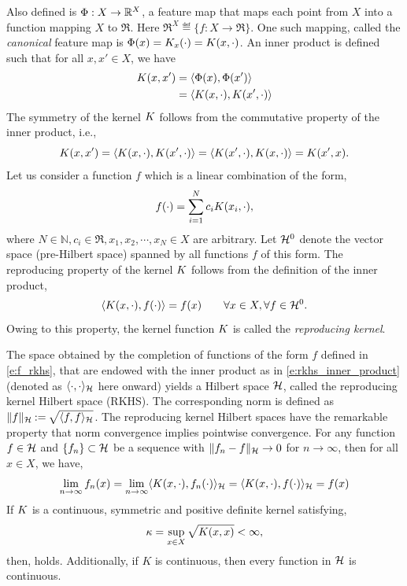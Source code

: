 Also defined is $\Phi: X \to \mathbb{R}^X$, a feature map that maps each point from $X$ into a function mapping $X$ to $\Re$. Here $\Re^X \eqdef \{f: X \to \Re \}$. One such mapping, called the \textit{canonical} feature map is $\Phi(x) = K_x(\cdot) =  K(x,\cdot)$. An inner product is defined such that for all $x,x' \in X$, we have
\begin{equation}
\begin{aligned}
\Kern(x,x') &= \langle \featuremap(x), \featuremap(x')\rangle \\
& = \langle \Kern(x,\cdot), \Kern(x',\cdot)\rangle
\end{aligned}
\label{e:rkhs_inner_product}
\end{equation}
The symmetry of the kernel $K$ follows from the commutative property of the inner product, i.e.,
\[
K(x,x') = \langle K(x, \cdot), K(x',\cdot) \rangle = \langle K(x',\cdot), K(x,\cdot) \rangle = K(x', x). 
\]
Let us consider a function $f$ which is a linear combination of the form,
\begin{equation}
f(\cdot) = \sum_{i=1}^N c_i \Kern(x_i, \cdot),
\label{e:f_rkhs}
\end{equation}
where $N \in \mathbb{N}, c_i \in \Re, x_1,x_2,\cdots, x_N \in X$ are arbitrary. Let ${\cal H}^0$ denote the vector space (pre-Hilbert space) spanned by all functions $f$ of this form. 
The reproducing property of the kernel $K$ follows from the definition of the inner product,
\[
\langle K(x,\cdot), f(\cdot)\rangle = f(x) \qquad \forall x \in X, \forall f \in {\cal H}^0.
\]
Owing to this property, the kernel function $K$ is called the \textit{reproducing kernel}. 

The space obtained by the completion of functions of the form $f$ defined in \eqref{e:f_rkhs}, that are endowed with the inner product as in \eqref{e:rkhs_inner_product} (denoted as $\langle \cdot, \cdot \rangle_{{\cal H}}$ here onward) yields a Hilbert space ${\cal H}$, called the reproducing kernel Hilbert space (RKHS). The corresponding norm is defined as $\|f\|_{\cal H} \mathbin{:=} \sqrt{\langle f, f \rangle_{\cal H}}$. The reproducing kernel Hilbert spaces have the remarkable property that norm convergence implies pointwise convergence. 
For any function $f\in{\cal H}$ and $\{f_n\}\subset {\cal H}$ be a sequence with $\|f_n - f\|_{\cal H} \to 0$ for $n \to \infty$, then for all $x \in X$, we have,
\[
\lim_{n\to\infty} f_n(x) = \lim_{n \to \infty} \langle K(x,\cdot),  f_n(\cdot) \rangle_{\cal H} = \langle K(x, \cdot), f(\cdot) \rangle_{\cal H} = f(x)
\]
If $K$ is a continuous, symmetric and positive definite kernel satisfying, 
\[
\kappa = \sup_{x \in X} \sqrt{K(x,x)} < \infty,
\]
then,  holds. Additionally, if $K$ is continuous, then every function in ${\cal H}$ is continuous. 

